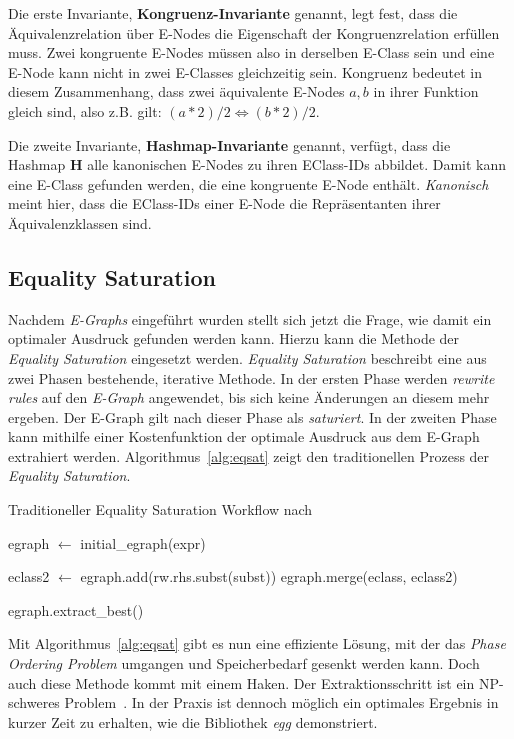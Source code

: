 Die erste Invariante, \textbf{Kongruenz-Invariante} genannt, legt fest, dass die Äquivalenzrelation über E-Nodes die Eigenschaft der Kongruenzrelation erfüllen muss.
Zwei kongruente E-Nodes müssen also in derselben E-Class sein und eine E-Node kann nicht in zwei E-Classes gleichzeitig sein.
Kongruenz bedeutet in diesem Zusammenhang, dass zwei äquivalente E-Nodes $a, b$ in ihrer Funktion gleich sind, also z.B. gilt: $(a * 2) / 2 \Leftrightarrow (b * 2) / 2$.

Die zweite Invariante, \textbf{Hashmap-Invariante} genannt, verfügt, dass die Hashmap $\mathbf{H}$ alle kanonischen E-Nodes zu ihren EClass-IDs abbildet.
Damit kann eine E-Class gefunden werden, die eine kongruente E-Node enthält. \textit{Kanonisch} meint hier, dass die EClass-IDs einer E-Node die Repräsentanten ihrer Äquivalenzklassen sind.

\subsection{Equality Saturation}

Nachdem \textit{E-Graphs} eingeführt wurden stellt sich jetzt die Frage, wie damit ein optimaler Ausdruck gefunden werden kann.
Hierzu kann die Methode der \textit{Equality Saturation} eingesetzt werden.
\textit{Equality Saturation} beschreibt eine aus zwei Phasen bestehende, iterative Methode.
In der ersten Phase werden \textit{rewrite rules} auf den \textit{E-Graph} angewendet, bis sich keine Änderungen an diesem mehr ergeben.
Der E-Graph gilt nach dieser Phase als \textit{saturiert}.
In der zweiten Phase kann mithilfe einer Kostenfunktion der optimale Ausdruck aus dem E-Graph extrahiert werden.
Algorithmus~\ref{alg:eqsat} zeigt den traditionellen Prozess der \textit{Equality Saturation}.

\begin{algorithm}[H]
  \caption{Traditioneller Equality Saturation Workflow nach~\cite{2021-egg}}\label{alg:eqsat}
  \begin{algorithmic}
    \State egraph $\gets$ initial\_egraph(expr)
    
      
          \State  eclass2 $\gets$ egraph.add(rw.rhs.subst(subst))
          \State egraph.merge(eclass, eclass2)
        \EndFor 
      \EndFor
    \EndWhile

    \State \Return egraph.extract\_best()
    \EndFunction
  \end{algorithmic}
\end{algorithm}

Mit Algorithmus~\ref{alg:eqsat} gibt es nun eine effiziente Lösung, mit der das \textit{Phase Ordering Problem} umgangen und Speicherbedarf gesenkt werden kann.
Doch auch diese Methode kommt mit einem Haken. Der Extraktionsschritt ist ein NP-schweres Problem~\cite{phaseorder-2009}. In der Praxis ist dennoch möglich ein optimales
Ergebnis in kurzer Zeit zu erhalten, wie die Bibliothek \textit{egg} demonstriert.  
